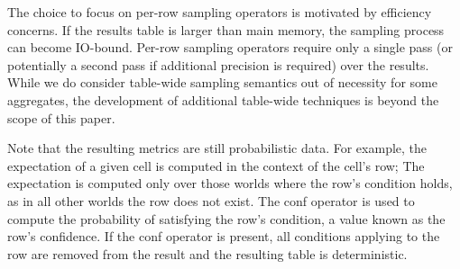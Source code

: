 The choice to focus on per-row sampling operators is motivated by efficiency concerns.  If the results table is larger than main memory, the sampling process can become IO-bound.  Per-row sampling operators require only a single pass (or potentially a second pass if additional precision is required) over the results.  While we do consider table-wide sampling semantics out of necessity for some aggregates, the development of additional table-wide techniques is beyond the scope of this paper.

Note that the resulting metrics are still probabilistic data.  For example, the expectation of a given cell is computed in the context of the cell's row; The expectation is computed only over those worlds where the row's condition holds, as in all other worlds the row does not exist.  The conf operator is used to compute the probability of satisfying the row's condition, a value known as the row's confidence.  If the conf operator is present, all conditions applying to the row are removed from the result and the resulting table is deterministic.

%
%

